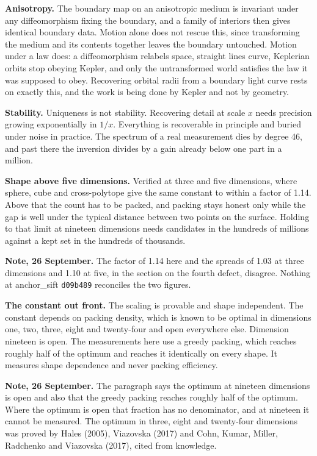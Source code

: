 \textbf{Anisotropy.} The boundary map on an anisotropic medium is invariant under any diffeomorphism fixing the boundary, and a family of interiors then gives identical boundary data. Motion alone does not rescue this, since transforming the medium and its contents together leaves the boundary untouched. Motion under a law does: a diffeomorphism relabels space, straight lines curve, Keplerian orbits stop obeying Kepler, and only the untransformed world satisfies the law it was supposed to obey. Recovering orbital radii from a boundary light curve rests on exactly this, and the work is being done by Kepler and not by geometry.

\textbf{Stability.} Uniqueness is not stability. Recovering detail at scale $x$ needs precision growing exponentially in $1/x$. Everything is recoverable in principle and buried under noise in practice. The spectrum of a real measurement dies by degree 46, and past there the inversion divides by a gain already below one part in a million.

\textbf{Shape above five dimensions.} Verified at three and five dimensions, where sphere, cube and cross-polytope give the same constant to within a factor of 1.14. Above that the count has to be packed, and packing stays honest only while the gap is well under the typical distance between two points on the surface. Holding to that limit at nineteen dimensions needs candidates in the hundreds of millions against a kept set in the hundreds of thousands.

\textbf{Note, 26 September.} The factor of 1.14 here and the spreads of 1.03 at three dimensions and 1.10 at five, in the section on the fourth defect, disagree. Nothing at anchor\_sift \texttt{d09b489} reconciles the two figures.

\textbf{The constant out front.} The scaling is provable and shape independent. The constant depends on packing density, which is known to be optimal in dimensions one, two, three, eight and twenty-four and open everywhere else. Dimension nineteen is open. The measurements here use a greedy packing, which reaches roughly half of the optimum and reaches it identically on every shape. It measures shape dependence and never packing efficiency.

\textbf{Note, 26 September.} The paragraph says the optimum at nineteen dimensions is open and also that the greedy packing reaches roughly half of the optimum. Where the optimum is open that fraction has no denominator, and at nineteen it cannot be measured. The optimum in three, eight and twenty-four dimensions was proved by Hales (2005), Viazovska (2017) and Cohn, Kumar, Miller, Radchenko and Viazovska (2017), cited from knowledge.

